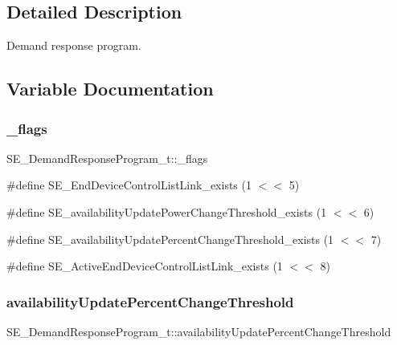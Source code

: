 \subsection{Detailed Description}
Demand response program. 

\subsection{Variable Documentation}
\mbox{\label{group__DemandResponseProgram_gabee537c682dee0fedf7998b5d1d7c40a}} 
\subsubsection{\texorpdfstring{\+\_\+flags}{\_flags}}
{\footnotesize\ttfamily S\+E\+\_\+\+Demand\+Response\+Program\+\_\+t\+::\+\_\+flags}

\#define S\+E\+\_\+\+End\+Device\+Control\+List\+Link\+\_\+exists (1 $<$$<$ 5)

\#define S\+E\+\_\+availability\+Update\+Power\+Change\+Threshold\+\_\+exists (1 $<$$<$ 6)

\#define S\+E\+\_\+availability\+Update\+Percent\+Change\+Threshold\+\_\+exists (1 $<$$<$ 7)

\#define S\+E\+\_\+\+Active\+End\+Device\+Control\+List\+Link\+\_\+exists (1 $<$$<$ 8) \mbox{\label{group__DemandResponseProgram_ga6eb5a29af00dc76559cac834c13483e7}} 
\subsubsection{\texorpdfstring{availability\+Update\+Percent\+Change\+Threshold}{availabilityUpdatePercentChangeThreshold}}
{\footnotesize\ttfamily S\+E\+\_\+\+Demand\+Response\+Program\+\_\+t\+::availability\+Update\+Percent\+Change\+Threshold}

